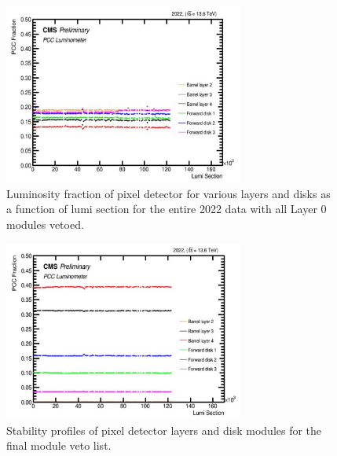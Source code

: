 \begin{figure}[!htp]
  \centering
  \includegraphics[width=0.7\textwidth]{ashish_thesis/PCC_stability_2022_L0veto_4.png}
  \caption[Luminosity fractions w/o layer 0 modules]{Luminosity fraction of pixel detector for various layers and disks as a function of lumi section for the entire 2022 data with all Layer 0 modules vetoed.}
  \label{fig:stabprof_69a}
\end{figure}


\begin{figure}[!htp]
  \centering
  \includegraphics[width=0.7\textwidth]{ashish_thesis/2022_pcc_stability_2.png}
  \caption[Stability profiles for final veto]{Stability profiles of pixel detector layers and disk modules for the final module veto list.}
  \label{fig:stabprof_69b}
\end{figure}


